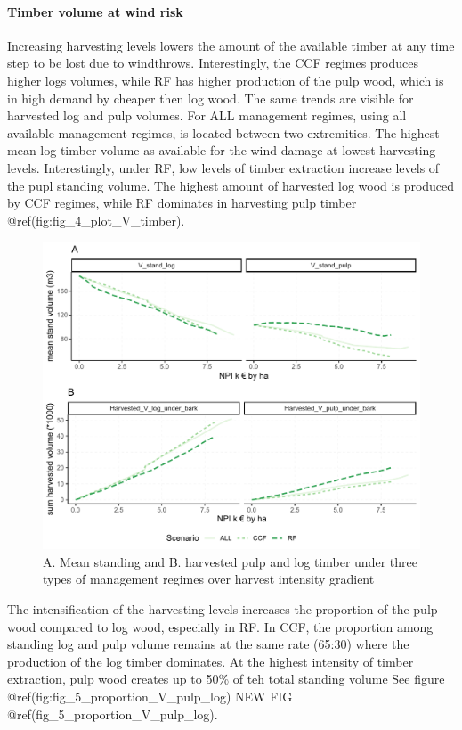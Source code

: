 \documentclass[]{elsarticle} %
\makeatletter
\def\maxwidth{\ifdim\Gin@nat@width>\linewidth\linewidth
\else\Gin@nat@width\fi}
\let\Oldincludegraphics\includegraphics
\renewcommand{\includegraphics}[1]{\Oldincludegraphics[width=\maxwidth]{#1}}
\makeatother
\begin{document}
\paragraph{Timber volume at wind risk}\label{timber-volume-at-wind-risk}

Increasing harvesting levels lowers the amount of the available timber
at any time step to be lost due to windthrows. Interestingly, the CCF
regimes produces higher logs volumes, while RF has higher production of
the pulp wood, which is in high demand by cheaper then log wood. The
same trends are visible for harvested log and pulp volumes. For ALL
management regimes, using all available management regimes, is located
between two extremities. The highest mean log timber volume as available
for the wind damage at lowest harvesting levels. Interestingly, under
RF, low levels of timber extraction increase levels of the pupl standing
volume. The highest amount of harvested log wood is produced by CCF
regimes, while RF dominates in harvesting pulp timber
@ref(fig:fig\_4\_plot\_V\_timber).

\begin{figure}
\centering
\includegraphics{test_manus_files/figure-latex/fig_4_plot_V_timber-1.pdf}
\caption{A. Mean standing and B. harvested pulp and log timber under
three types of management regimes over harvest intensity gradient}
\end{figure}

The intensification of the harvesting levels increases the proportion of
the pulp wood compared to log wood, especially in RF. In CCF, the
proportion among standing log and pulp volume remains at the same rate
(65:30) where the production of the log timber dominates. At the highest
intensity of timber extraction, pulp wood creates up to 50\% of teh
total standing volume See figure
@ref(fig:fig\_5\_proportion\_V\_pulp\_log) NEW FIG
@ref(fig\_5\_proportion\_V\_pulp\_log).
\end{document}
